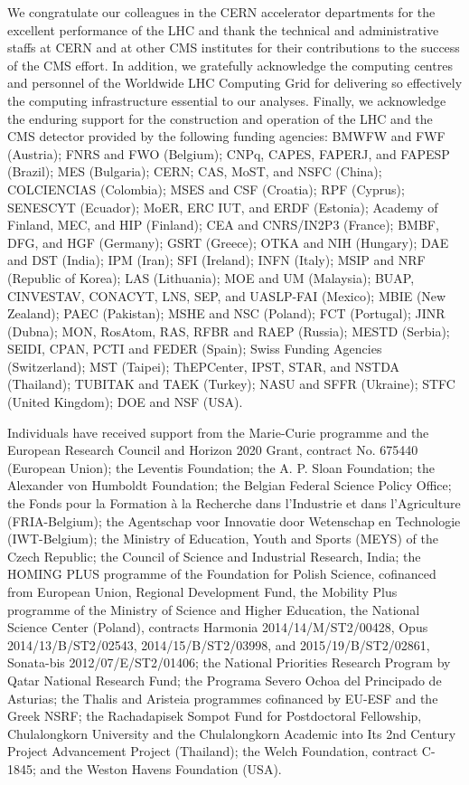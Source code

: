 \begin{acknowledgments}
We congratulate our colleagues in the CERN accelerator departments for
the excellent performance of the LHC and thank the technical and
administrative staffs at CERN and at other CMS institutes for their
contributions to the success of the CMS effort. In addition, we
gratefully acknowledge the computing centres and personnel of the
Worldwide LHC Computing Grid for delivering so effectively the
computing infrastructure essential to our analyses. Finally, we
acknowledge the enduring support for the construction and operation of
the LHC and the CMS detector provided by the following funding
agencies: BMWFW and FWF (Austria); FNRS and FWO (Belgium); CNPq,
CAPES, FAPERJ, and FAPESP (Brazil); MES (Bulgaria); CERN; CAS, MoST,
and NSFC (China); COLCIENCIAS (Colombia); MSES and CSF (Croatia); RPF
(Cyprus); SENESCYT (Ecuador); MoER, ERC IUT, and ERDF (Estonia);
Academy of Finland, MEC, and HIP (Finland); CEA and CNRS/IN2P3
(France); BMBF, DFG, and HGF (Germany); GSRT (Greece); OTKA and NIH
(Hungary); DAE and DST (India); IPM (Iran); SFI (Ireland); INFN
(Italy); MSIP and NRF (Republic of Korea); LAS (Lithuania); MOE and UM
(Malaysia); BUAP, CINVESTAV, CONACYT, LNS, SEP, and UASLP-FAI
(Mexico); MBIE (New Zealand); PAEC (Pakistan); MSHE and NSC (Poland);
FCT (Portugal); JINR (Dubna); MON, RosAtom, RAS, RFBR and RAEP
(Russia); MESTD (Serbia); SEIDI, CPAN, PCTI and FEDER (Spain); Swiss
Funding Agencies (Switzerland); MST (Taipei); ThEPCenter, IPST, STAR,
and NSTDA (Thailand); TUBITAK and TAEK (Turkey); NASU and SFFR
(Ukraine); STFC (United Kingdom); DOE and NSF (USA).

 Individuals have received support from the
Marie-Curie programme and the European Research Council and Horizon
2020 Grant, contract No. 675440 (European Union); the Leventis
Foundation; the A. P. Sloan Foundation; the Alexander von Humboldt
Foundation; the Belgian Federal Science Policy Office; the Fonds pour
la Formation \`a la Recherche dans l'Industrie et dans l'Agriculture
(FRIA-Belgium); the Agentschap voor Innovatie door Wetenschap en
Technologie (IWT-Belgium); the Ministry of Education, Youth and Sports
(MEYS) of the Czech Republic; the Council of Science and Industrial
Research, India; the HOMING PLUS programme of the Foundation for
Polish Science, cofinanced from European Union, Regional Development
Fund, the Mobility Plus programme of the Ministry of Science and
Higher Education, the National Science Center (Poland), contracts
Harmonia 2014/14/M/ST2/00428, Opus 2014/13/B/ST2/02543,
2014/15/B/ST2/03998, and 2015/19/B/ST2/02861, Sonata-bis
2012/07/E/ST2/01406; the National Priorities Research Program by Qatar
National Research Fund; the Programa Severo Ochoa del Principado de
Asturias; the Thalis and Aristeia programmes cofinanced by EU-ESF and
the Greek NSRF; the Rachadapisek Sompot Fund for Postdoctoral
Fellowship, Chulalongkorn University and the Chulalongkorn Academic
into Its 2nd Century Project Advancement Project (Thailand); the Welch
Foundation, contract C-1845; and the Weston Havens Foundation (USA). 
\end{acknowledgments}

